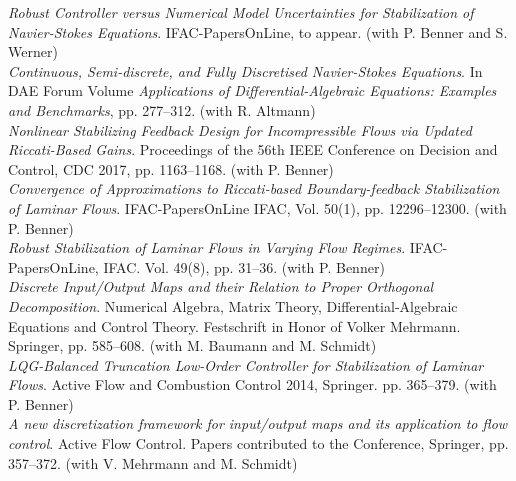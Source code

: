  \emph{Robust Controller versus Numerical Model Uncertainties for Stabilization of Navier-Stokes Equations}. IFAC-PapersOnLine, to appear. (with P. Benner and S. Werner) \\ %

 \emph{Continuous, Semi-discrete, and Fully Discretised Navier-Stokes Equations}. In DAE Forum Volume \emph{Applications of Differential-Algebraic Equations: Examples and Benchmarks}, pp. 277--312. (with R. Altmann) \\ %

 \emph{Nonlinear Stabilizing Feedback Design for Incompressible Flows via Updated Riccati-Based Gains}. Proceedings of the 56th IEEE Conference on Decision and Control, CDC 2017, pp. 1163--1168. (with P. Benner) \\ %

 {\emph{Convergence of Approximations to Riccati-based Boundary-feedback Stabilization of Laminar Flows}. IFAC-PapersOnLine IFAC, Vol. 50(1), pp. 12296--12300.} (with P. Benner) \\ %

 \emph{Robust Stabilization of Laminar Flows in Varying Flow Regimes}. IFAC-PapersOnLine, IFAC. Vol. 49(8), pp. 31--36. (with P. Benner) \\ %

 \emph{Discrete Input/Output Maps and their Relation to Proper Orthogonal Decomposition}. Numerical Algebra, Matrix Theory, Differential-Algebraic Equations and Control Theory. Festschrift in Honor of Volker Mehrmann. Springer, pp. 585--608. (with M. Baumann and M. Schmidt) \\ %

 {{\emph{LQG-Balanced Truncation Low-Order Controller for Stabilization of Laminar Flows}}. Active Flow and Combustion Control 2014, Springer. pp. 365--379.} (with P. Benner) \\ %

 \emph{A new discretization framework for input/output maps and its application to flow control}. Active Flow Control. Papers contributed to the Conference, Springer, pp. 357--372. (with V. Mehrmann and M. Schmidt) \\ %


